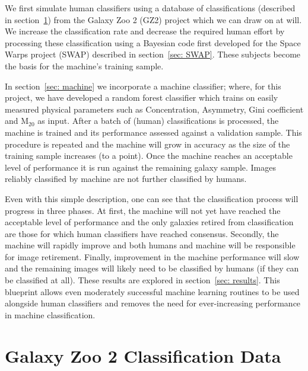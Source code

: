 \documentclass[twocolumn]{aastex6}
\begin{document}
We first simulate human classifiers using a database of classifications 
(described in section~\ref{sec: data}) from the Galaxy Zoo 2 (GZ2) project which
we can draw on at will. We increase the classification rate and decrease the 
required human effort by processing these classification using a Bayesian code first 
developed for the Space Warps project (SWAP) described in section~\ref{sec: SWAP}.
These subjects become the basis for the machine's training sample. 

In section~\ref{sec: machine} we incorporate a machine classifier; where, for this
project, we have developed a random forest classifier which trains on easily measured 
physical parameters such as Concentration, Asymmetry, Gini coefficient and M$_{20}$ as input. 
After a batch of (human) classifications is processed,  the machine is trained and 
its performance assessed against a validation sample. This procedure is repeated and 
the machine will grow in accuracy as the size of the training sample increases (to a point). 
Once the machine reaches an acceptable level of performance it is run against the 
remaining galaxy sample. Images reliably classified by machine are not further classified by humans.

Even with this simple description, one can see that the classification process 
will progress in three phases. At first, the machine will not yet have reached the 
acceptable level of performance and the only galaxies retired from classification
 are those for which human classifiers have reached consensus. 
Secondly, the machine will rapidly improve and both humans and machine will be 
responsible for image retirement. Finally, improvement in the machine performance 
will slow and the remaining images will likely need to be classified by humans (if they can be 
classified at all). These results are explored in section~\ref{sec: results}. 
This blueprint allows even moderately successful machine learning 
routines to be used alongside human classifiers and removes the need for 
ever-increasing performance in machine classification.



\section{Galaxy Zoo 2 Classification Data} \label{sec: data}
\end{document}
